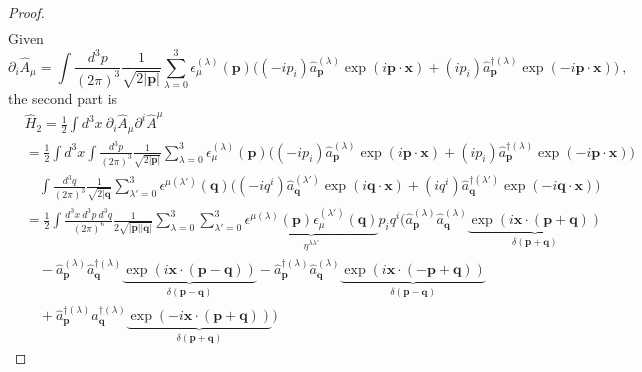 \begin{proof}
\begin{equation*}
\begin{aligned}
        \end{aligned}
        \end{equation*}
        Given 
        \begin{equation*}
            \partial_i \hat A_\mu = \int \frac{d^3 p}{(2\pi)^3} \frac{1}{\sqrt{2 |\mathbf p|}} \sum_{\lambda=0}^{3} \epsilon_\mu^{(\lambda)} (\mathbf p) \Big ( (- i p_i )\hat a_{\mathbf p}^{(\lambda)} \exp(i \mathbf p \cdot \mathbf x) + (i p_i)\hat a_{\mathbf p}^{\dagger (\lambda)}  \exp(- i \mathbf p \cdot \mathbf x) \Big) ~,
        \end{equation*}
        the second part is
        \begin{equation*}
        \begin{aligned}
            & \hat H_2 = \frac{1}{2} \int d^3 x ~ \partial_i \hat A_\mu \partial^i \hat A^\mu \\ & = \frac{1}{2} \int d^3 x \int \frac{d^3 p}{(2\pi)^3} \frac{1}{\sqrt{2 |\mathbf p|}} \sum_{\lambda=0}^{3} \epsilon_\mu^{(\lambda)} (\mathbf p) \Big ( (- i p_i ) \hat a_{\mathbf p}^{(\lambda)} \exp(i \mathbf p \cdot \mathbf x) + (i p_i)\hat a_{\mathbf p}^{\dagger (\lambda)}  \exp(- i \mathbf p \cdot \mathbf x) \Big) \\ & \quad \int \frac{d^3 q}{(2\pi)^3} \frac{1}{\sqrt{2 |\mathbf q}} \sum_{\lambda'=0}^{3} \epsilon^{\mu(\lambda')} (\mathbf q) \Big ( (- i q^i )\hat a_{\mathbf q}^{(\lambda')} \exp(i \mathbf q \cdot \mathbf x) + (i q^i)\hat a_{\mathbf q}^{\dagger (\lambda')} \exp(- i \mathbf q \cdot \mathbf x) \Big) \\ & = \frac{1}{2} \int \frac{d^3 x ~ d^3 p ~ d^3 q}{(2\pi)^6} \frac{1}{2\sqrt{|\mathbf p| |\mathbf q|}} \sum_{\lambda=0}^{3} \sum_{\lambda'=0}^{3} \underbrace{\epsilon^{\mu(\lambda)} (\mathbf p) \epsilon_{\mu}^{(\lambda')} (\mathbf q)}_{\eta^{\lambda \lambda'}} p_i q^i ( \hat a_{\mathbf p}^{(\lambda)} \hat a_{\mathbf q}^{(\lambda)} \underbrace{\exp(i  \mathbf x \cdot (\mathbf p + \mathbf q)) }_{\delta(\mathbf p + \mathbf q)} \\ & \quad - \hat a_{\mathbf p}^{(\lambda)}\hat a_{\mathbf q}^{\dagger (\lambda)} \underbrace{\exp(i \mathbf x \cdot (\mathbf p - \mathbf q)) }_{\delta(\mathbf p - \mathbf q)} - \hat a_{\mathbf p}^{\dagger (\lambda)} \hat a_{\mathbf q}^{(\lambda)} \underbrace{\exp( i  \mathbf x \cdot ( -\mathbf p + \mathbf q)) }_{\delta(\mathbf p - \mathbf q)} \\ & \quad + \hat a_{\mathbf p}^{\dagger (\lambda)} \hat a_{\mathbf q}^{\dagger (\lambda)} \underbrace{\exp(- i  \mathbf x \cdot (\mathbf p + \mathbf q)) }_{\delta(\mathbf p + \mathbf q)})

\end{aligned}
\end{equation*}
\end{proof}
